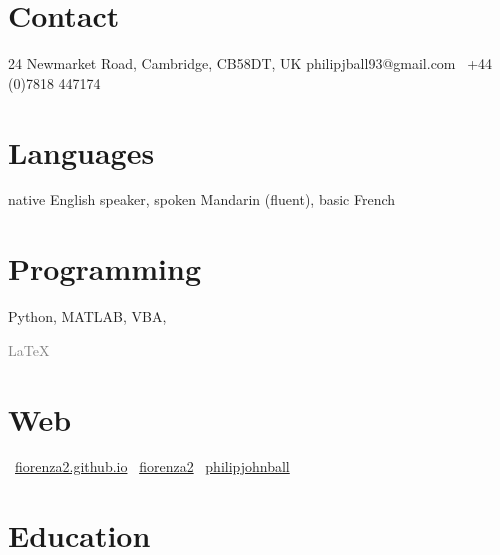 \documentclass[]{friggeri-cv} %
\begin{document}



\begin{aside} %
\section{Contact}
24 Newmarket Road, Cambridge, CB58DT, UK
philipjball93@gmail.com
\faMobile\ +44 (0)7818 447174
\section{Languages}
native English speaker,
spoken Mandarin (fluent),
basic French
\section{Programming}
Python, MATLAB, VBA, \textcolor{gray}{\begin{myfont}\LaTeX\ \end{myfont}}
\section{Web}
\faHome\ \href{https://fiorenza2.github.io}{fiorenza2.github.io}
\faGithub\ \href{https://github.com/fiorenza2}{fiorenza2}
\faLinkedin\ \href{https://uk.linkedin.com/in/philipjohnball}{philipjohnball}
\end{aside}


\section{Education}
\end{document}
